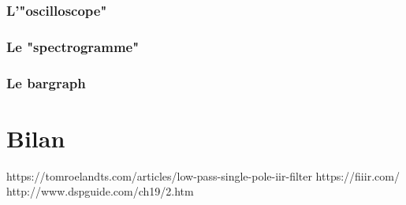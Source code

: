 \documentclass{article}
\begin{document}
    \section{L'"oscilloscope"}
    \section{Le "spectrogramme"}
    \section{Le bargraph}
    \part*{Bilan}
  
\newpage
https://tomroelandts.com/articles/low-pass-single-pole-iir-filter
https://fiiir.com/
http://www.dspguide.com/ch19/2.htm
\end{document}
